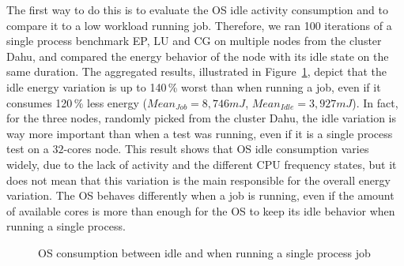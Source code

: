 The first way to do this is to evaluate the OS idle activity consumption and to compare it to a low workload running job.
Therefore, we ran 100 iterations of a single process benchmark \textsf{EP}, \textsf{LU} and \textsf{CG} on multiple nodes from the cluster \textsf{Dahu}, and compared the energy behavior of the node with its idle state on the same duration.
The aggregated results, illustrated in Figure~\ref{fig:os-idle}, depict that the idle energy variation is up to 140\,\% worst than when running a job, even if it consumes 120\,\% less energy ($Mean_{Job}=8,746 mJ$, $Mean_{Idle}=3,927 mJ$).
In fact, for the three nodes, randomly picked from the cluster \textsf{Dahu}, the idle variation is way more important than when a test was running, even if it is a single process test on a $32$-cores node.
This result shows that OS idle consumption varies widely, due to the lack of activity and the different CPU frequency states, but it does not mean that this variation is the main responsible for the overall energy variation.
The OS behaves differently when a job is running, even if the amount of available cores is more than enough for the OS to keep its idle behavior when running a single process.

\begin{figure}
    \caption{OS consumption between idle and when running a single process job}\label{fig:os-idle}
\end{figure}

